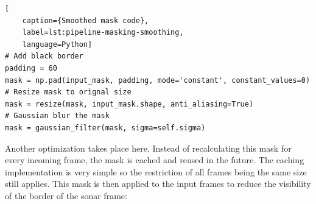\begin{lstlisting}[
    caption={Smoothed mask code},
    label=lst:pipeline-masking-smoothing,
    language=Python]
# Add black border
padding = 60
mask = np.pad(input_mask, padding, mode='constant', constant_values=0)
# Resize mask to orignal size
mask = resize(mask, input_mask.shape, anti_aliasing=True)
# Gaussian blur the mask
mask = gaussian_filter(mask, sigma=self.sigma)
\end{lstlisting}

Another optimization takes place here. Instead of recalculating this mask for every incoming frame, the mask is cached and reused in the future. The caching implementation is very simple so the restriction of all frames being the same size still applies. This mask is then applied to the input frames to reduce the visibility of the border of the sonar frame:

